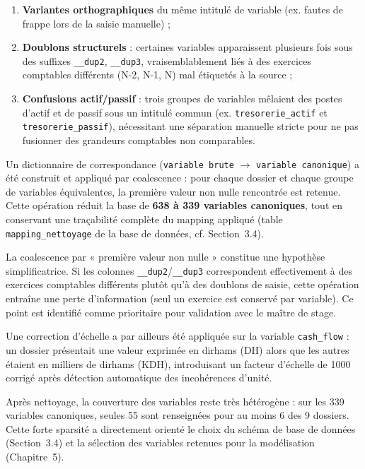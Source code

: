 \begin{enumerate}
    \item \textbf{Variantes orthographiques} du même intitulé de variable (ex. fautes de frappe
    lors de la saisie manuelle) ;
    \item \textbf{Doublons structurels} : certaines variables apparaissent plusieurs fois sous
    des suffixes \texttt{\_\_dup2}, \texttt{\_\_dup3}, vraisemblablement liés à des exercices
    comptables différents (N-2, N-1, N) mal étiquetés à la source ;
    \item \textbf{Confusions actif/passif} : trois groupes de variables mêlaient des postes
    d'actif et de passif sous un intitulé commun (ex. \texttt{tresorerie\_actif} et
    \texttt{tresorerie\_passif}), nécessitant une séparation manuelle stricte pour ne pas
    fusionner des grandeurs comptables non comparables.
\end{enumerate}

Un dictionnaire de correspondance (\texttt{variable brute} $\rightarrow$ \texttt{variable
canonique}) a été construit et appliqué par coalescence : pour chaque dossier et chaque groupe
de variables équivalentes, la première valeur non nulle rencontrée est retenue. Cette opération
réduit la base de \textbf{638 à 339 variables canoniques}, tout en conservant une traçabilité
complète du mapping appliqué (table \texttt{mapping\_nettoyage} de la base de données, cf.
Section~3.4).

\begin{limite}
La coalescence par « première valeur non nulle » constitue une hypothèse simplificatrice.
Si les colonnes \texttt{\_\_dup2}/\texttt{\_\_dup3} correspondent effectivement à des exercices
comptables différents plutôt qu'à des doublons de saisie, cette opération entraîne une perte
d'information (seul un exercice est conservé par variable). Ce point est identifié comme
prioritaire pour validation avec le maître de stage.
\end{limite}

Une correction d'échelle a par ailleurs été appliquée sur la variable \texttt{cash\_flow} : un
dossier présentait une valeur exprimée en dirhams (DH) alors que les autres étaient en milliers
de dirhams (KDH), introduisant un facteur d'échelle de 1000 corrigé après détection automatique
des incohérences d'unité.

Après nettoyage, la couverture des variables reste très hétérogène : sur les 339 variables
canoniques, seules 55 sont renseignées pour au moins 6 des 9 dossiers. Cette forte sparsité a
directement orienté le choix du schéma de base de données (Section~3.4) et la sélection des
variables retenues pour la modélisation (Chapitre~5).

